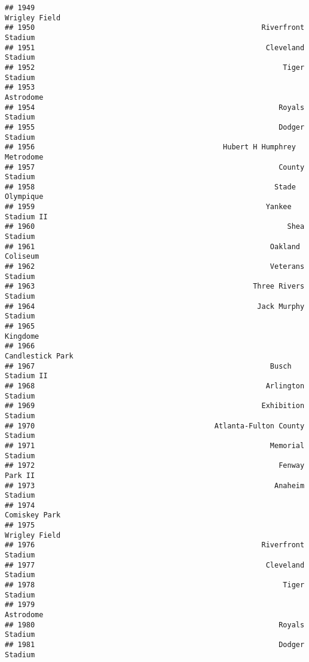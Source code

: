 \documentclass[]{article}
\begin{document}
\begin{verbatim}
## 1949                                                          Wrigley Field
## 1950                                                     Riverfront Stadium
## 1951                                                      Cleveland Stadium
## 1952                                                          Tiger Stadium
## 1953                                                              Astrodome
## 1954                                                         Royals Stadium
## 1955                                                         Dodger Stadium
## 1956                                            Hubert H Humphrey Metrodome
## 1957                                                         County Stadium
## 1958                                                        Stade Olympique
## 1959                                                      Yankee Stadium II
## 1960                                                           Shea Stadium
## 1961                                                       Oakland Coliseum
## 1962                                                       Veterans Stadium
## 1963                                                   Three Rivers Stadium
## 1964                                                    Jack Murphy Stadium
## 1965                                                               Kingdome
## 1966                                                       Candlestick Park
## 1967                                                       Busch Stadium II
## 1968                                                      Arlington Stadium
## 1969                                                     Exhibition Stadium
## 1970                                          Atlanta-Fulton County Stadium
## 1971                                                       Memorial Stadium
## 1972                                                         Fenway Park II
## 1973                                                        Anaheim Stadium
## 1974                                                          Comiskey Park
## 1975                                                          Wrigley Field
## 1976                                                     Riverfront Stadium
## 1977                                                      Cleveland Stadium
## 1978                                                          Tiger Stadium
## 1979                                                              Astrodome
## 1980                                                         Royals Stadium
## 1981                                                         Dodger Stadium

\end{verbatim}
\end{document}

